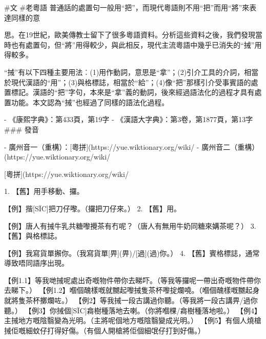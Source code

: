#文 #老粵語 
普通話的處置句一般用“把”，而現代粵語則不用“把”而用“將”來表達同樣的意

思。在19世紀，歐美傳教士留下了很多粵語資料。分析這些資料之後，我們發現當時也有處置句，但“將”用得較少，與此相反，現代主流粵語中幾乎已消失的“𢬿”用得較多。  

  

“𢬿”有以下四種主要用法︰(1)用作動詞，意思是“拿”；(2)引介工具的介詞，相當於現代漢語的“用”；(3)與格標誌，相當於“給”；(4)像“把”那樣引介受事賓語的處置標記。漢語的“把”字句，本來是“拿”義的動詞，後來經過語法化的過程才具有處置功能。本文認為“𢬿”也經過了同樣的語法化過程。

  
  


  

  

- 《康熙字典》：第433頁，第19字
- 《漢語大字典》：第3卷，第1877頁，第13字
### 發音


- 廣州音一（重構）：[粵拼](https://yue.wiktionary.org/wiki/%
- 廣州音二（重構）(https://yue.wiktionary.org/wiki/%

[粵拼](https://yue.wiktionary.org/wiki/%


  1. 【舊】用手移動、攞。

【例】揩[SĪC]把刀仔嚟。（攞把刀仔來。）
2. 【舊】用。

【例】唐人有𢬿牛乳共糖嚟攪茶有冇呢？（唐人有無用牛奶同糖來媾茶呢？）
3. 【舊】與格標誌。

【例】我寫貨單𢶷你。（我寫貨單[畀](畀)/[過](過)你。）
4. 【舊】賓格標誌，通常導致唔同語序出現。

【例1.1】等我哋𢬿呢處出奇嘅物件帶你去睇吓。（等我等攞呢一帶出奇嘅物件帶你去睇下。）
【例1.2】嗰個醜樣嘅就嬲起嚟𢬿隻茶杯嚟掟爛嘵。（嗰個醜樣嘅嬲起身就將隻茶杯擲爛咗。）
【例2】等我𢬿一段古講過你聽。（等我將一段古講畀/過你聽。）
【例3】你𢬿個[SĪC]樖樹種落地去喇。（你將嗰棵/樖樹種落地啦。）
【例4】主𢬿地方嘅陰翳變為光明。（主將呢個地方嘅陰翳變成光明。）
【例5】有個人燒槍𢬿佢嘅細蚊仔打得好傷。（有個人開槍將佢個細氓仔打到好傷。）